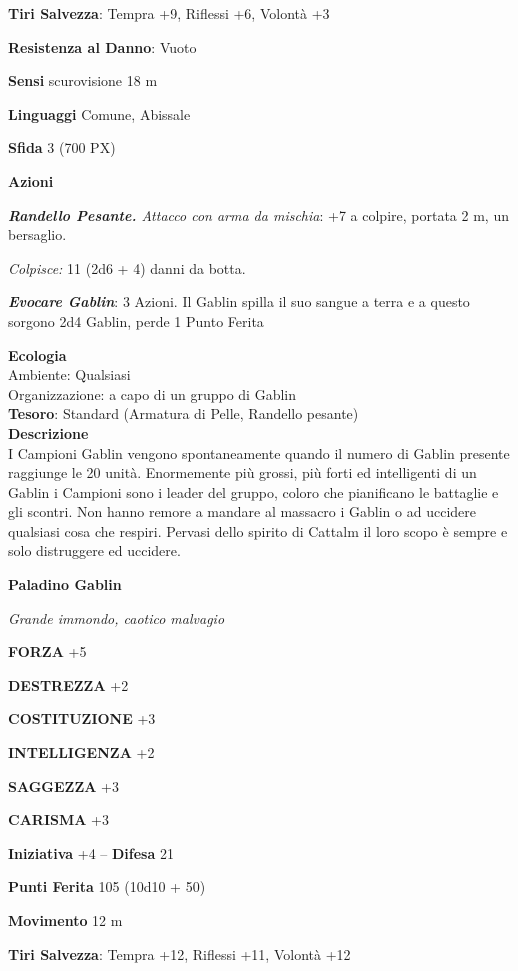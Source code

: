 \begin{multicols}{2}
	\textbf{Tiri Salvezza}: Tempra +9, Riflessi +6, Volontà +3

	\textbf{Resistenza al Danno}: Vuoto

	\textbf{Sensi} scurovisione 18 m

	\textbf{Linguaggi} Comune, Abissale

	\textbf{Sfida} 3 (700 PX)

	\textbf{Azioni}

	\textit{\textbf{Randello Pesante.} Attacco con arma da mischia}: +7 a colpire, portata 2 m, un bersaglio.

	\textit{Colpisce:} 11 (2d6 + 4) danni da botta.

	\textit{\textbf{Evocare Gablin}}: 3 Azioni. Il Gablin spilla il suo sangue a terra e a questo sorgono 2d4 Gablin, perde 1 Punto Ferita

	\textbf{Ecologia}\\
	Ambiente: Qualsiasi\\
	Organizzazione: a capo di un gruppo di Gablin\\
	\textbf{Tesoro}: Standard (Armatura di Pelle, Randello pesante)\\
	\textbf{Descrizione}\\
	I Campioni Gablin vengono spontaneamente quando il numero di Gablin presente raggiunge le 20 unità. Enormemente più grossi, più forti ed intelligenti di un Gablin i Campioni sono i leader del gruppo, coloro che pianificano le battaglie e gli scontri.
	Non hanno remore a mandare al massacro i Gablin o ad uccidere qualsiasi cosa che respiri. Pervasi dello spirito di Cattalm il loro scopo è sempre e solo distruggere ed uccidere.


	\medskip{}\textbf{Paladino Gablin}

	\textit{Grande immondo, caotico malvagio}

	\textbf{FORZA} +5

	\textbf{DESTREZZA} +2

	\textbf{COSTITUZIONE} +3

	\textbf{INTELLIGENZA} +2

	\textbf{SAGGEZZA} +3

	\textbf{CARISMA} +3

	\textbf{Iniziativa} +4 -- \textbf{Difesa} 21

	\textbf{Punti Ferita} 105 (10d10 + 50)

	\textbf{Movimento} 12 m

	\textbf{Tiri Salvezza}: Tempra +12, Riflessi +11, Volontà +12


\end{multicols}
